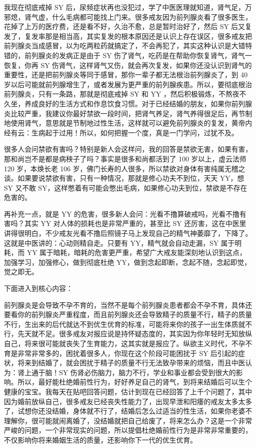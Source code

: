\documentclass{ctexart}
\begin{document}
我现在彻底戒掉 SY 后，尿频症状再也没犯过，学了中医医理就知道，肾气足，万邪熄，肾气虚，什么毛病都可能找上门来。很多戒友因为前列腺炎看了很多医生，花掉了上万的医疗费，还是看不好，久治不愈，总是暂时治好了，然后 SY 后又复发了，复发率那是相当高，其实复发的根本原因还是认识上存在误区，很多戒友把前列腺炎当成感冒，以为吃两粒药就搞定了，不会再犯了，其实这种认识是大错特错的，前列腺炎的发病正是由于 SY 伤了肾气，吃药是在帮助你恢复肾气，肾气一恢复，你再 SY 伤肾气，这样肾气又伤，就会再次复发，如果你还没认识到肾气的重要性，还是把前列腺炎等同于感冒，那你一辈子都无法根治前列腺炎了，到 40 岁以后可能就前列腺增生了，或者发展为更严重的前列腺疾患。所以，要彻底根治前列腺炎，只有一条路，那就是彻底戒掉 SY 和 YY ，然后积极锻炼，不熬夜不久坐，养成良好的生活方式和作息饮食习惯。对于已经结婚的朋友，如果你前列腺炎比较严重，我建议你最好禁欲一段时间，把肾气养足，肾气养得很足后，再节制地使用肾气，意思就是节制地过性生活，这样就可以避免前列腺炎的复发，黄帝内经有云：生病起于过用！所以，如何把握一个度，真是一门学问，过犹不及。

很多人会问禁欲有害吗？特别是新人会这样问，我的回答是禁欲无害，如果有害，那和尚岂不是都是病秧子了吗？事实是很多和尚都活到了 100 岁以上，虚云法师 120 岁，本焕长老 106 岁，佛门长寿的人很多，所以禁欲对身体有害纯属无稽之谈。如果要说禁欲有害，只有一种情况，那就是修心功夫不到位，天天 YY，想 SY 又不敢 SY，这样憋着有可能会憋出毛病，如果修心功夫到位，禁欲是不存在危害的。

再补充一点，就是 YY 的危害，很多新人会问：光看不撸算破戒吗，光看不撸有害吗？其实 YY 对人体的损耗也是非常严重的，甚至比 SY 还厉害，这在中医里讲得很明白，不少戒友光看不撸后照镜子马上发现自己的精气神萎靡了，下降了。这就是中医讲的：心动则精自走。只要有 YY，精气就会自动走漏，SY 属于明耗，而 YY 属于暗耗，暗耗的危害更严重，希望广大戒友能深刻地认识到这点，加强学习，加强修心，做到彻底杜绝 YY，做到念起即断，念起不随，念起即觉，觉之即无。

下面进入到核心内容：

前列腺炎是会导致不孕不育的，当然不是每个前列腺炎患者都会不孕不育，具体还要看你的前列腺炎严重程度，而且前列腺炎还会导致精子的质量不行，精子的质量不行，生出来的后代就达不到优生优育的标准，可能将来你的孩子一出生体质就不行，先天就不足。很多戒友对报应说是持怀疑态度的，其实因为你年轻时无知放纵自己，将来很可能就丧失了生育能力，这其实就是报应了。纵欲主义时代，不孕不育是非常非常多的，困扰着很多人，你现在这个阶段可能困扰于 SY 后引起的症状，将来到结婚了，就会困扰于精子的质量不行无法致孕带来的烦恼，而且中医认为：肾上通于脑！SY 伤肾必伤脑力，脑力不行，学业和事业都会受到很大的影响。所以，最好能杜绝婚前性行为，好好养足自己的肾气，到将来结婚后可以生个健康的宝宝。我每天在贴吧回答问题，估计到现在已经回答了上千个问题了，其中因为婚前放纵自己，很多戒友已经丧失性能力了，出现早泄和阳痿的戒友太多太多了，试想你还没结婚，身体就不行了，结婚后怎么过适当的性生活，如果你老婆不理解你，很可能就闹离婚了，没结婚就把自己给废了，将来怎么办？这是一个非常严峻的问题，一个非常现实的问题，所以提倡杜绝婚前性行为是非常非常重要的，不仅影响你将来婚姻生活的质量，还影响你下一代的优生优育。
\end{document}
